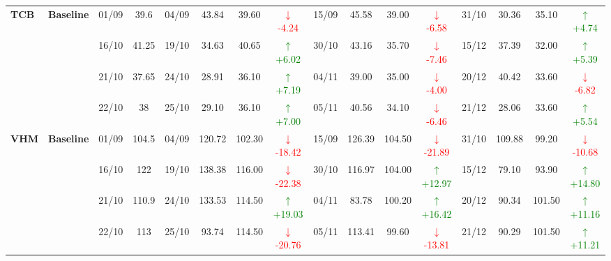 {\begin{longtable}{llcc|cccc|cccc|cccc}
\multirow{4}{*}{\textbf{TCB}}
& \textbf{Baseline}
& 01/09 & 39.6 & 04/09 & 43.84 & 39.60 & \textcolor{red}{\(\downarrow\)-4.24} & 15/09 & 45.58 & 39.00 & \textcolor{red}{\(\downarrow\)-6.58} & 31/10 & 30.36 & 35.10 & \textcolor{green}{\(\uparrow\)+4.74} \\
& & 16/10 & 41.25 & 19/10 & 34.63 & 40.65 & \textcolor{green}{\(\uparrow\)+6.02} & 30/10 & 43.16 & 35.70 & \textcolor{red}{\(\downarrow\)-7.46} & 15/12 & 37.39 & 32.00 & \textcolor{green}{\(\uparrow\)+5.39} \\
& & 21/10 & 37.65 & 24/10 & 28.91 & 36.10 & \textcolor{green}{\(\uparrow\)+7.19} & 04/11 & 39.00 & 35.00 & \textcolor{red}{\(\downarrow\)-4.00} & 20/12 & 40.42 & 33.60 & \textcolor{red}{\(\downarrow\)-6.82} \\
& & 22/10 & 38 & 25/10 & 29.10 & 36.10 & \textcolor{green}{\(\uparrow\)+7.00} & 05/11 & 40.56 & 34.10 & \textcolor{red}{\(\downarrow\)-6.46} & 21/12 & 28.06 & 33.60 & \textcolor{green}{\(\uparrow\)+5.54} \\
\midrule

\multirow{4}{*}{\textbf{VHM}}
& \textbf{Baseline}
& 01/09 & 104.5 & 04/09 & 120.72 & 102.30 & \textcolor{red}{\(\downarrow\)-18.42} & 15/09 & 126.39 & 104.50 & \textcolor{red}{\(\downarrow\)-21.89} & 31/10 & 109.88 & 99.20 & \textcolor{red}{\(\downarrow\)-10.68} \\
& & 16/10 & 122 & 19/10 & 138.38 & 116.00 & \textcolor{red}{\(\downarrow\)-22.38} & 30/10 & 116.97 & 104.00 & \textcolor{green}{\(\uparrow\)+12.97} & 15/12 & 79.10 & 93.90 & \textcolor{green}{\(\uparrow\)+14.80} \\
& & 21/10 & 110.9 & 24/10 & 133.53 & 114.50 & \textcolor{green}{\(\uparrow\)+19.03} & 04/11 & 83.78 & 100.20 & \textcolor{green}{\(\uparrow\)+16.42} & 20/12 & 90.34 & 101.50 & \textcolor{green}{\(\uparrow\)+11.16} \\
& & 22/10 & 113 & 25/10 & 93.74 & 114.50 & \textcolor{red}{\(\downarrow\)-20.76} & 05/11 & 113.41 & 99.60 & \textcolor{red}{\(\downarrow\)-13.81} & 21/12 & 90.29 & 101.50 & \textcolor{green}{\(\uparrow\)+11.21} \\
\midrule


\end{longtable}}
